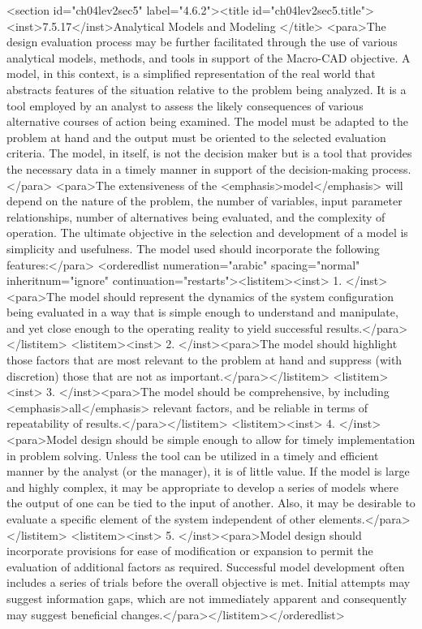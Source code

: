 <section id="ch04lev2sec5" label="4.6.2"><title id="ch04lev2sec5.title"><inst>7.5.17</inst>Analytical Models and Modeling
</title>
<para>The design evaluation process may be further facilitated through the use of various analytical models, methods, and tools in support of the Macro-CAD objective. A model, in this context, is a simplified representation of the real world that abstracts features of the situation relative to the problem being analyzed. It is a tool employed by an analyst to assess the likely consequences of various alternative courses of action being examined. The model must be adapted to the problem at hand and the output must be oriented to the selected evaluation criteria. The model, in itself, is not the decision maker but is a tool that provides the necessary data in a timely manner in support of the decision-making process.</para>
<para>The extensiveness of the <emphasis>model</emphasis> will depend on the nature of the problem, the number of variables, input parameter relationships, number of alternatives being evaluated, and the complexity of operation. The ultimate objective in the selection and development of a model is simplicity and usefulness. The model used should incorporate the following features:</para>
<orderedlist numeration="arabic" spacing="normal" inheritnum="ignore" continuation="restarts"><listitem><inst>	1.	</inst><para>The model should represent the dynamics of the system configuration being evaluated in a way that is simple enough to understand and manipulate, and yet close enough to the operating reality to yield successful results.</para></listitem>
<listitem><inst>	2.	</inst><para>The model should highlight those factors that are most relevant to the problem at hand and suppress (with discretion) those that are not as important.</para></listitem>
<listitem><inst>	3.	</inst><para>The model should be comprehensive, by including <emphasis>all</emphasis> relevant factors, and be reliable in terms of repeatability of results.</para></listitem>
<listitem><inst>	4.	</inst><para>Model design should be simple enough to allow for timely implementation in problem solving. Unless the tool can be utilized in a timely and efficient manner by the analyst (or the manager), it is of little value. If the model is large and highly complex, it may be appropriate to develop a series of models where the output of one can be tied to the input of another. Also, it may be desirable to evaluate a specific element of the system independent of other elements.</para></listitem>
<listitem><inst>	5.	</inst><para>Model design should incorporate provisions for ease of modification or expansion to permit the evaluation of additional factors as required. Successful model development often includes a series of trials before the overall objective is met. Initial attempts may suggest information gaps, which are not immediately apparent and consequently may suggest beneficial changes.</para></listitem></orderedlist>
